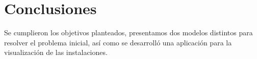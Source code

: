 \section{Conclusiones}

Se cumplieron los objetivos planteados, presentamos dos modelos distintos para resolver el problema inicial, así como se desarrolló una aplicación para la visualización de las instalaciones.